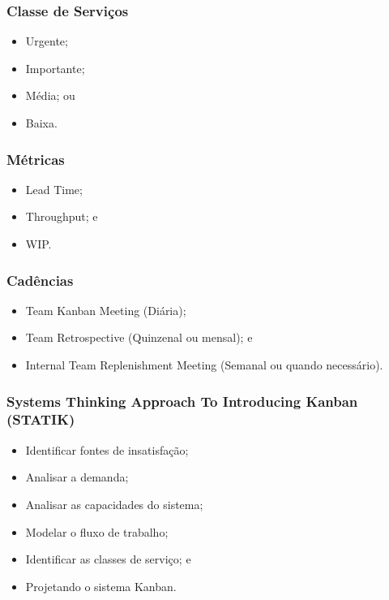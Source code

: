 \documentclass[aspectratio=169]{beamer}
\begin{document}
\begin{frame}
	\frametitle{Classe de Servi\c cos}
	
	\begin{itemize}
		\item Urgente;
		\item Importante;
		\item Média; ou
		\item Baixa.
	\end{itemize}
\end{frame}

\begin{frame}
	\frametitle{Métricas}
	
	\begin{itemize}
		\item Lead Time;
		\item Throughput; e
		\item WIP.
	\end{itemize}
\end{frame}

\begin{frame}
	\frametitle{Cadências}
	
	\begin{itemize}
		\item Team Kanban Meeting (Diária);
		\item Team Retrospective (Quinzenal ou mensal); e
		\item Internal Team Replenishment Meeting (Semanal ou quando
necessário).
	\end{itemize}
\end{frame}

\begin{frame}
	\frametitle{Systems Thinking Approach To Introducing Kanban (STATIK)}
	
	\begin{itemize}
		\item Identificar fontes de insatisfação;
		\item Analisar a demanda;
		\item Analisar as capacidades do sistema;
		\item Modelar o fluxo de trabalho;
		\item Identificar as classes de serviço; e
		\item Projetando o sistema Kanban.
	\end{itemize}
\end{frame}
\end{document}
